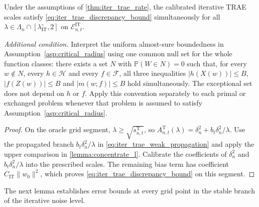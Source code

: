 \begin{corollary}\label{cor:iter_trae_discrepancy_bound}
Under the assumptions of \cref{thm:iter_trae_rate}, the calibrated iterative TRAE scales satisfy \eqref{eq:iter_trae_discrepancy_bound} simultaneously for all $\lambda\in\Lambda_n\cap[\lambda_{\mathrm{IT}}^\circ,2]$ on $\mathcal E_{n,t}^{\mathrm{IT}}$.

\emph{Additional condition.} Interpret the uniform almost-sure boundedness in Assumption~\ref{asp:critical_radius} using one common null set for the whole function classes: there exists a set $N$ with $\mathbb P(W\in N)=0$ such that, for every $w\notin N$, every $h\in\mathcal H$ and every $f\in\mathcal F$, all three inequalities $|h(X(w))|\leqslant B$, $|f(Z(w))|\leqslant B$ and $|m(w;f)|\leqslant B$ hold simultaneously. The exceptional set does not depend on $h$ or $f$. Apply this convention separately to each primal or exchanged problem whenever that problem is assumed to satisfy Assumption~\ref{asp:critical_radius}.
\end{corollary}
\begin{proof}
On the oracle grid segment,
$\lambda\geqslant\sqrt{s_{n,t}^{\mathrm T}}$, so
$A_{n,t}^{\mathrm T}(\lambda)=\delta_n^2+b_t\delta_n^2/\lambda$.
Use the propagated branch $b_t\delta_n^2/\lambda$ in
\eqref{eq:iter_trae_weak_propagation} and apply the upper comparison in
\cref{lemma:concentrate_l}. Calibrate the coefficients of $\delta_n^2$
and $b_t\delta_n^2/\lambda$ into the prescribed scales. The remaining
bias term has coefficient $C_{\mathrm{IT}}\|w_0\|^2$, which proves
\eqref{eq:iter_trae_discrepancy_bound} on this segment.
\end{proof}

The next lemma establishes error bounds at every grid point in the stable branch of the iterative noise level.

